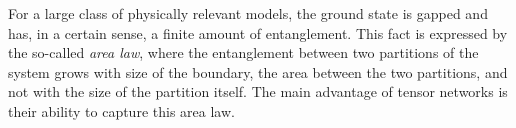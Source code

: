 For a large class of physically relevant models, the ground state is gapped and has, in a certain sense, a finite amount of entanglement.
This fact is expressed by the so-called \emph{area law}, where the entanglement between two partitions of the system grows with size of the boundary, the area between the two partitions, and not with the size of the partition itself.
The main advantage of tensor networks is their ability to capture this area law.


